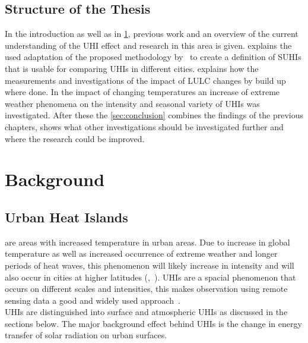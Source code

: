 \documentclass[12pt,a4paper, english,twoside]{scrartcl}
\begin{document}
  \subsection{Structure of the Thesis}\label{ssec:structure} 
    In the introduction as well as in \cref{sec:background}, previous work and an overview of the current understanding of the \gls{UHI} effect and research in this area is given. 
     explains the used adaptation of the proposed methodology by~\cite{Sobrino2020} to create a definition of \glspl{SUHI} that is usable for comparing \glspl{UHI} in different cities.  
     explains how the measurements  and investigations of the impact of \gls{LULC} changes by build up where done.
    In  the impact of changing temperatures an increase of extreme weather phenomena on the intensity and seasonal variety of \glspl{UHI} was investigated. 
    After these the \cref{sec:conclusion} combines the findings of the previous chapters, shows what other investigations should be investigated further and where the research could be improved. 
%
\newpage
\section{Background}\label{sec:background}
  \subsection{Urban Heat Islands}\label{sec:uhi}
     are areas with increased temperature in urban areas.
    Due to increase in global temperature as well as increased occurrence of extreme weather and longer periods of heat waves, this phenomenon will likely increase in intensity and will also occur in cities at higher latitudes (\cite{Sachindra2016},~\cite[p.~904]{Wilby2008}).
    \glspl{UHI} are a spacial phenomenon that occurs on different scales and intensities, this makes observation using remote sensing data a good and widely used approach~\autocite{Weng2003}.\\
    \glspl{UHI} are distinguished into surface and atmospheric \glspl{UHI} as discussed in the sections below. 
    The major background effect behind \glspl{UHI} is the change in energy transfer of solar radiation on urban surfaces. 
\end{document}
